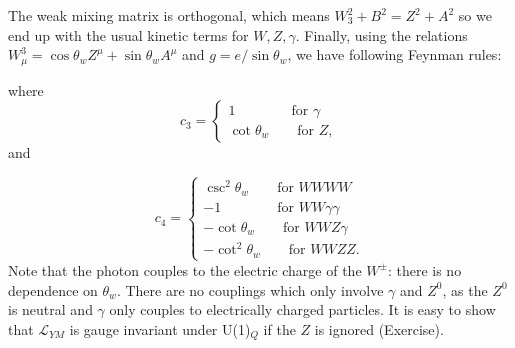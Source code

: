 \documentclass[a4paper,12pt]{article}
\begin{document}
The weak mixing matrix is orthogonal, which means $W_3^2 + B^2 = Z^2 + A^2$ so we end up with the usual kinetic terms for $W, Z, \gamma$. Finally, using the relations $W_\mu^3 = \cos\theta_wZ^\mu + \sin\theta_w A^\mu$ and $g=e/\sin\theta_w$, we have following Feynman rules:
\newline
\begin{figure}[!h]
  \centering
  \hfill
\end{figure}
\newline
where 
\begin{equation}
c_3 =
\begin{cases}
1 \qquad \qquad \text{for } \gamma\\
\cot\theta_w \qquad \text{for } Z,
\end{cases}
\end{equation}
and

\begin{equation}
c_4 =
\begin{cases}
\csc^2\theta_w \qquad \text{for } WWWW\\
-1 \qquad \qquad \text{for } WW\gamma \gamma \\
-\cot\theta_w \qquad \text{for } WWZ \gamma \\
-\cot^2\theta_w \qquad \text{for } WWZZ.
\end{cases}
\end{equation}
Note that the photon couples to the electric charge of the $W^\pm$: there is no dependence on $\theta_w$. There are no couplings which only involve $\gamma$ and $Z^0$, as the $Z^0$ is neutral and $\gamma$ only couples to electrically charged particles. It is easy to show that $\mathcal{L}_{YM}$ is gauge invariant under U(1)$_Q$ if the $Z$ is ignored (Exercise). 
%
\end{document}

